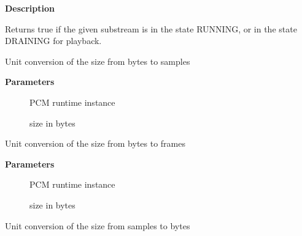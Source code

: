 \documentclass[a4paper,8pt,english]{sphinxmanual}
\begin{document}
\textbf{Description}

Returns true if the given substream is in the state RUNNING, or in the
state DRAINING for playback.

\begin{fulllineitems}
\label{sound/kernel-api/alsa-driver-api:c.bytes_to_samples}
Unit conversion of the size from bytes to samples

\end{fulllineitems}


\textbf{Parameters}
\begin{description}
\item[{}] \leavevmode
PCM runtime instance

\item[{}] \leavevmode
size in bytes

\end{description}

\begin{fulllineitems}
\label{sound/kernel-api/alsa-driver-api:c.bytes_to_frames}
Unit conversion of the size from bytes to frames

\end{fulllineitems}


\textbf{Parameters}
\begin{description}
\item[{}] \leavevmode
PCM runtime instance

\item[{}] \leavevmode
size in bytes

\end{description}

\begin{fulllineitems}
\label{sound/kernel-api/alsa-driver-api:c.samples_to_bytes}
Unit conversion of the size from samples to bytes

\end{fulllineitems}
\end{document}

